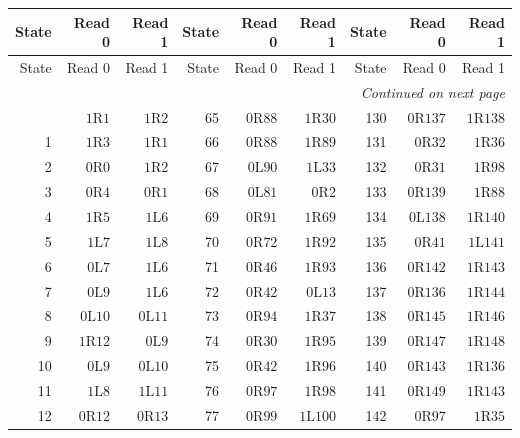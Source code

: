 {\small\setlength{\tabcolsep}{5pt}
\renewcommand{\arraystretch}{1.08}
\begin{longtable}{@{}rrrrrrrrr@{}}
\toprule
State & Read 0 & Read 1 & State & Read 0 & Read 1 & State & Read 0 & Read 1\\\midrule\endfirsthead
\toprule
State & Read 0 & Read 1 & State & Read 0 & Read 1 & State & Read 0 & Read 1\\\midrule\endhead
\midrule\multicolumn{9}{r}{\emph{Continued on next page}}\\\endfoot
\bottomrule\endlastfoot
0 & $1\mathrm{R}1$ & $1\mathrm{R}2$ & 65 & $0\mathrm{R}88$ & $1\mathrm{R}30$ & 130 & $0\mathrm{R}137$ & $1\mathrm{R}138$\\
1 & $1\mathrm{R}3$ & $1\mathrm{R}1$ & 66 & $0\mathrm{R}88$ & $1\mathrm{R}89$ & 131 & $0\mathrm{R}32$ & $1\mathrm{R}36$\\
2 & $0\mathrm{R}0$ & $1\mathrm{R}2$ & 67 & $0\mathrm{L}90$ & $1\mathrm{L}33$ & 132 & $0\mathrm{R}31$ & $1\mathrm{R}98$\\
3 & $0\mathrm{R}4$ & $0\mathrm{R}1$ & 68 & $0\mathrm{L}81$ & $0\mathrm{R}2$ & 133 & $0\mathrm{R}139$ & $1\mathrm{R}88$\\
4 & $1\mathrm{R}5$ & $1\mathrm{L}6$ & 69 & $0\mathrm{R}91$ & $1\mathrm{R}69$ & 134 & $0\mathrm{L}138$ & $1\mathrm{R}140$\\
5 & $1\mathrm{L}7$ & $1\mathrm{L}8$ & 70 & $0\mathrm{R}72$ & $1\mathrm{R}92$ & 135 & $0\mathrm{R}41$ & $1\mathrm{L}141$\\
6 & $0\mathrm{L}7$ & $1\mathrm{L}6$ & 71 & $0\mathrm{R}46$ & $1\mathrm{R}93$ & 136 & $0\mathrm{R}142$ & $1\mathrm{R}143$\\
7 & $0\mathrm{L}9$ & $1\mathrm{L}6$ & 72 & $0\mathrm{R}42$ & $0\mathrm{L}13$ & 137 & $0\mathrm{R}136$ & $1\mathrm{R}144$\\
8 & $0\mathrm{L}10$ & $0\mathrm{L}11$ & 73 & $0\mathrm{R}94$ & $1\mathrm{R}37$ & 138 & $0\mathrm{R}145$ & $1\mathrm{R}146$\\
9 & $1\mathrm{R}12$ & $0\mathrm{L}9$ & 74 & $0\mathrm{R}30$ & $1\mathrm{R}95$ & 139 & $0\mathrm{R}147$ & $1\mathrm{R}148$\\
10 & $0\mathrm{L}9$ & $0\mathrm{L}10$ & 75 & $0\mathrm{R}42$ & $1\mathrm{R}96$ & 140 & $0\mathrm{R}143$ & $1\mathrm{R}136$\\
11 & $1\mathrm{L}8$ & $1\mathrm{L}11$ & 76 & $0\mathrm{R}97$ & $1\mathrm{R}98$ & 141 & $0\mathrm{R}149$ & $1\mathrm{R}143$\\
12 & $0\mathrm{R}12$ & $0\mathrm{R}13$ & 77 & $0\mathrm{R}99$ & $1\mathrm{L}100$ & 142 & $0\mathrm{R}97$ & $1\mathrm{R}35$\\

\end{longtable}}

